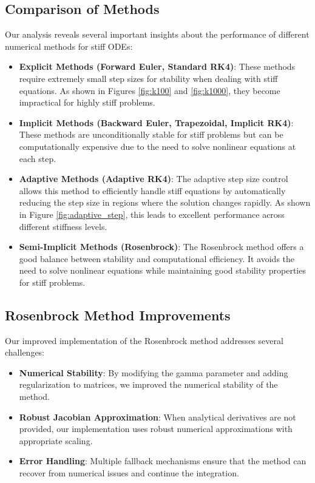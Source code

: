 \documentclass[11pt,a4paper]{article}
\begin{document}
\subsection{Comparison of Methods}

Our analysis reveals several important insights about the performance of different numerical methods for stiff ODEs:

\begin{itemize}
    \item \textbf{Explicit Methods (Forward Euler, Standard RK4)}: These methods require extremely small step sizes for stability when dealing with stiff equations. As shown in Figures \ref{fig:k100} and \ref{fig:k1000}, they become impractical for highly stiff problems.
    
    \item \textbf{Implicit Methods (Backward Euler, Trapezoidal, Implicit RK4)}: These methods are unconditionally stable for stiff problems but can be computationally expensive due to the need to solve nonlinear equations at each step.
    
    \item \textbf{Adaptive Methods (Adaptive RK4)}: The adaptive step size control allows this method to efficiently handle stiff equations by automatically reducing the step size in regions where the solution changes rapidly. As shown in Figure \ref{fig:adaptive_step}, this leads to excellent performance across different stiffness levels.
    
    \item \textbf{Semi-Implicit Methods (Rosenbrock)}: The Rosenbrock method offers a good balance between stability and computational efficiency. It avoids the need to solve nonlinear equations while maintaining good stability properties for stiff problems.
\end{itemize}

\subsection{Rosenbrock Method Improvements}

Our improved implementation of the Rosenbrock method addresses several challenges:

\begin{itemize}
    \item \textbf{Numerical Stability}: By modifying the gamma parameter and adding regularization to matrices, we improved the numerical stability of the method.
    
    \item \textbf{Robust Jacobian Approximation}: When analytical derivatives are not provided, our implementation uses robust numerical approximations with appropriate scaling.
    
    \item \textbf{Error Handling}: Multiple fallback mechanisms ensure that the method can recover from numerical issues and continue the integration.
\end{itemize}
\end{document}
